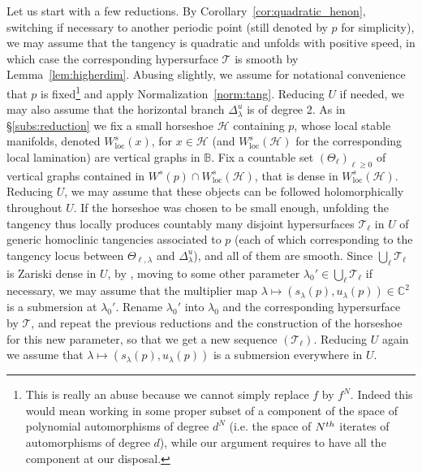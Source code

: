 \documentclass[11pt, oneside]{amsart}
\newcommand{\C}{\mathbb{C}}
\newcommand{\B}{\mathbb{B}}
\newcommand{\abs}[1]{\left\vert#1\right\vert}
\newcommand{\la}{\lambda}
\newcommand{\lo}{{\lambda_0}}
\newcommand{\loc}{{\mathrm{loc}}}
\DeclareMathOperator{\jac}{Jac}
\theoremstyle{remark}
\theoremstyle{definition}
\theoremstyle{theorem}
\newcommand{\commentaire}[1]{}
\begin{document}
Let us start with a few reductions. 
By Corollary~\ref{cor:quadratic_henon}, switching if necessary
 to another periodic point 
 (still denoted by $p$ for simplicity),  we may assume that the tangency is 
quadratic and unfolds with positive speed, in which case the corresponding hypersurface 
$\mathcal T$ is smooth %
by Lemma~\ref{lem:higherdim}. 
Abusing slightly,   we  assume for notational
convenience that $p$ is fixed\footnote{This is really an abuse because we cannot simply replace $f$ by $f^N$. 
Indeed  this would mean working 
 in  some proper subset of a component of the space of polynomial automorphisms of degree $d^N$ (i.e. the space of $N^{\rm th}$ iterates of automorphisms of degree $d$), while our argument requires to have all the component at our disposal.}  
and apply  Normalization~\ref{norm:tang}.  Reducing $U$ if needed, we may also assume that the horizontal branch $\Delta^u_\lambda$ is of degree 2. 
As in \S\ref{subs:reduction} we fix a small
horseshoe $\mathcal H$ containing $p$,      whose local stable manifolds,
denoted $W^s_\loc(x)$, for  $x\in \mathcal H$ 
(and $W^s_\loc(\mathcal H)$ for the corresponding local lamination)
 are vertical graphs in $\B$. 
Fix a countable set $(\Theta_\ell)_{\ell \geq 0}$  of vertical graphs contained in  
$W^s(p)\cap W^s_\loc(\mathcal H)$,  
   that  is dense in $W^s_\loc(\mathcal H)$. \commentaire{Fixed and explain notation, cf Minor comment \#10.}
Reducing $U$, we may assume that these objects  can be followed holomorphically  throughout $U$. 
If the horseshoe was chosen to be small enough, 
unfolding the tangency thus locally produces countably many disjoint 
hypersurfaces $\mathcal T_\ell$ in $U$ 
of generic homoclinic tangencies associated to $p$ 
(each of which corresponding to the tangency locus between 
$\Theta_{\ell, \lambda}$ and $\Delta^u_\lambda$), and  all of them are smooth.  
Since $\bigcup_\ell\mathcal T_\ell$ is Zariski dense in $U$, 
by \cite[Thm 1.4]{BHI}, moving to some other parameter $\la_0'\in \bigcup_\ell\mathcal T_\ell$ if necessary,
we may assume that the multiplier map 
  $\lambda \mapsto (s_\la(p), u_\la(p))\in \C^2$ is a submersion at $\la_0'$. 
  Rename $\la_0'$ into 
  $\lo$ and   the corresponding hypersurface by $\mathcal T$, and repeat
the previous reductions and the construction of the horseshoe 
 for this new parameter, so that we get a new sequence $(\mathcal T_\ell)$. 
 Reducing $U$ again we assume that 
  $\lambda \mapsto (s_\la(p), u_\la(p))$ is a submersion everywhere in $U$. 
  
\end{document}
